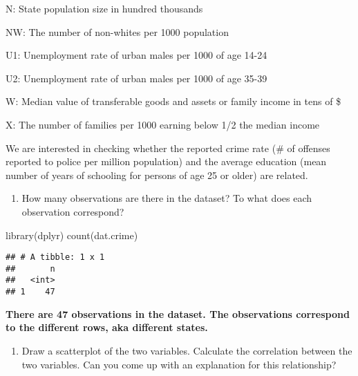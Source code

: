 \documentclass[
]{article}
\newenvironment{Shaded}{\begin{snugshade}}{\end{snugshade}}
\newcommand{\AttributeTok}[1]{\textcolor[rgb]{0.77,0.63,0.00}{#1}}
\newcommand{\FunctionTok}[1]{\textcolor[rgb]{0.00,0.00,0.00}{#1}}
\newcommand{\NormalTok}[1]{#1}
\newcommand{\SpecialCharTok}[1]{\textcolor[rgb]{0.00,0.00,0.00}{#1}}
\newcommand{\StringTok}[1]{\textcolor[rgb]{0.31,0.60,0.02}{#1}}
\providecommand{\tightlist}{%
  \setlength{\itemsep}{0pt}\setlength{\parskip}{0pt}}
\begin{document}
N: State population size in hundred thousands

NW: The number of non-whites per 1000 population

U1: Unemployment rate of urban males per 1000 of age 14-24

U2: Unemployment rate of urban males per 1000 of age 35-39

W: Median value of transferable goods and assets or family income in
tens of \$

X: The number of families per 1000 earning below 1/2 the median income

We are interested in checking whether the reported crime rate (\# of
offenses reported to police per million population) and the average
education (mean number of years of schooling for persons of age 25 or
older) are related.

\begin{enumerate}
\def\labelenumi{\arabic{enumi}.}
\tightlist
\item
  How many observations are there in the dataset? To what does each
  observation correspond?
\end{enumerate}

\begin{Shaded}
\begin{Highlighting}[]
\FunctionTok{library}\NormalTok{(dplyr)}
\FunctionTok{count}\NormalTok{(dat.crime)}
\end{Highlighting}
\end{Shaded}

\begin{verbatim}
## # A tibble: 1 x 1
##       n
##   <int>
## 1    47
\end{verbatim}

\textbf{There are 47 observations in the dataset. The observations
correspond to the different rows, aka different states.}

\begin{enumerate}
\def\labelenumi{\arabic{enumi}.}
\setcounter{enumi}{1}
\tightlist
\item
  Draw a scatterplot of the two variables. Calculate the correlation
  between the two variables. Can you come up with an explanation for
  this relationship?
\end{enumerate}

\begin{Shaded}
\end{Shaded}
\end{document}
